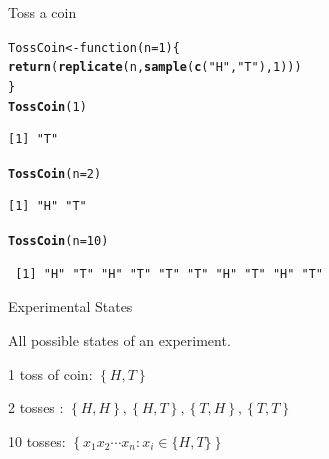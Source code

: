 \documentclass{beamer}\usepackage[]{graphicx}\usepackage[]{color}
\makeatletter
\newcommand{\hlnum}[1]{\textcolor[rgb]{0.2,0.2,0.2}{#1}}%
\newcommand{\hlstr}[1]{\textcolor[rgb]{0.2,0.2,0.2}{#1}}%
\newcommand{\hlstd}[1]{\textcolor[rgb]{0.102,0.102,0.102}{#1}}%
\newcommand{\hlkwa}[1]{\textcolor[rgb]{0.102,0.102,0.102}{#1}}%
\newcommand{\hlkwb}[1]{\textcolor[rgb]{0.102,0.102,0.102}{#1}}%
\newcommand{\hlkwc}[1]{\textcolor[rgb]{0.2,0.2,0.2}{#1}}%
\newcommand{\hlkwd}[1]{\textcolor[rgb]{0.102,0.102,0.102}{\textbf{#1}}}%
\newenvironment{kframe}{%
 \def\at@end@of@kframe{}%
 \ifinner\ifhmode%
  \def\at@end@of@kframe{\end{minipage}}%
  \begin{minipage}{\columnwidth}%
 \fi\fi%
 \def\FrameCommand##1{\hskip\@totalleftmargin \hskip-\fboxsep
 \colorbox{shadecolor}{##1}\hskip-\fboxsep
     \hskip-\linewidth \hskip-\@totalleftmargin \hskip\columnwidth}%
 \MakeFramed {\advance\hsize-\width
   \@totalleftmargin\z@ \linewidth\hsize
   \@setminipage}}%
 {\par\unskip\endMakeFramed%
 \at@end@of@kframe}
\newenvironment{knitrout}{}{} %
\renewenvironment{knitrout}{\begin{spacing}{0.75}\begin{tiny}}{\end{tiny}\end{spacing}}
\makeatother
\begin{document}
\begin{frame}[fragile]{Toss a coin \;\;}

\begin{knitrout}\small
{}\color{fgcolor}\begin{kframe}
\begin{alltt}
\hlstd{TossCoin} \hlkwb{<-} \hlkwa{function}\hlstd{(}\hlkwc{n}\hlstd{=}\hlnum{1}\hlstd{)\{}
    \hlkwd{return}\hlstd{(}\hlkwd{replicate}\hlstd{(n,} \hlkwd{sample}\hlstd{(}\hlkwd{c}\hlstd{(}\hlstr{"H"}\hlstd{,}\hlstr{"T"}\hlstd{),}\hlnum{1}\hlstd{)))}
\hlstd{\}}
\hlkwd{TossCoin}\hlstd{(}\hlnum{1}\hlstd{)}
\end{alltt}
\begin{verbatim}
[1] "T"
\end{verbatim}
\begin{alltt}
\hlkwd{TossCoin}\hlstd{(}\hlkwc{n}\hlstd{=}\hlnum{2}\hlstd{)}
\end{alltt}
\begin{verbatim}
[1] "H" "T"
\end{verbatim}
\begin{alltt}
\hlkwd{TossCoin}\hlstd{(}\hlkwc{n}\hlstd{=}\hlnum{10}\hlstd{)}
\end{alltt}
\begin{verbatim}
 [1] "H" "T" "H" "T" "T" "T" "H" "T" "H" "T"
\end{verbatim}
\end{kframe}
\end{knitrout}

\end{frame}

\begin{frame}[fragile]{Experimental States \;\;}

All possible states of an experiment.

1 toss of coin: $\left \{ H, T  \right \}$ \pause \newline

2 tosses : $\left \{H, H \right \}, \left \{H, T \right \}, \left \{T, H \right \},
            \left \{T, T \right \}$ \pause \newline

10 tosses: $\left\{x_{1}x_{2} \cdots x_{n} : x_{i} \in \{H,T \} \right \}$

\end{frame}
\end{document}
